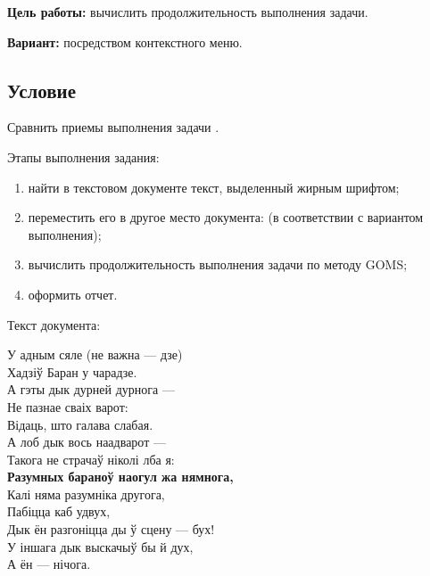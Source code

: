 \documentclass{bsuir}
\begin{document}
\maketitle
\mainmatter

\textbf{Цель работы:}
вычислить продолжительность выполнения задачи.

\textbf{Вариант:}
посредством контекстного меню.

\subsection{Условие}

Сравнить приемы выполнения задачи .

Этапы выполнения задания:

\begin{enumerate}
      \item
            найти в текстовом документе текст, выделенный жирным шрифтом;
      \item
            переместить его в другое место документа: (в соответствии с вариантом
            выполнения);
      \item
            вычислить продолжительность выполнения задачи по методу GOMS;
      \item
            оформить отчет.
\end{enumerate}

Текст документа:

\begin{center}
      У адным сяле (не важна — дзе) \\
      Хадзіў Баран у чарадзе. \\
      А гэты дык дурней дурнога — \\
      Не пазнае сваіх варот: \\
      Відаць, што галава слабая. \\
      А лоб дык вось наадварот — \\
      Такога не страчаў ніколі лба я: \\
      \textbf{Разумных бараноў наогул жа нямнога,} \\
      Калі няма разумніка другога, \\
      Пабіцца каб удвух, \\
      Дык ён разгоніцца ды ў сцену — бух! \\
      У іншага дык выскачыў бы й дух, \\
      А ён — нічога.
\end{center}
\end{document}
